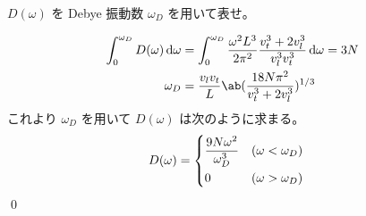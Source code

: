 \documentclass[uplatex,dvipdfmx,a4paper,11pt]{jlreq}
\makeatletter
\numberwithin{equation}{section}
\theoremstyle{definition}
\renewenvironment{proof}[1][\proofname]{\par
  \normalfont
  \topsep6\p@\@plus6\p@ \trivlist
  \item[\hskip\labelsep{\bfseries #1}\@addpunct{\bfseries}]\ignorespaces\quad\par
}{%
  \qed\endtrivlist\@endpefalse
}
\renewcommand\proofname{証明}
\makeatother
\begin{document}
\begin{problem}
$D(\omega)$ を Debye 振動数 $\omega_D$ を用いて表せ。
\end{problem}
\begin{proof}
  \begin{align}
    \int_0^{\omega_D}D(\omega)\dl{\omega} & = \int_0^{\omega_D}\frac{\omega^2 L^3}{2\pi^2}\frac{v_t^3 + 2v_l^3}{v_l^3v_t^3}\dl{\omega} = 3N \\
    \omega_D                              & = \frac{v_lv_t}{L}\ab(\frac{18N\pi^2}{v_t^3 + 2v_l^3})^{1/3}
  \end{align}
  これより $\omega_D$ を用いて $D(\omega)$ は次のように求まる。
  \begin{align}
    D(\omega) & = \begin{dcases}
                    \frac{9N\omega^2}{\omega_D^3} & (\omega < \omega_D) \\
                    0                             & (\omega > \omega_D)
                  \end{dcases}
  \end{align}
\end{proof}
\end{document}
